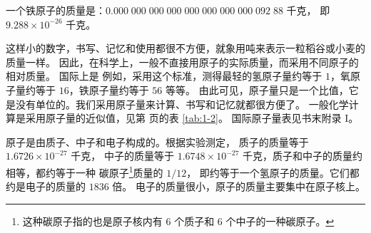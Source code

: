 一个铁原子的质量是：$0.000 \; 000 \; 000 \; 000 \; 000 \; 000 \; 000 \; 000 \; 092 \; 88$ 千克，
即 $9.288 \times 10^{-26}$ 千克。

这样小的数字，书写、记忆和使用都很不方便，就象用吨来表示一粒稻谷或小麦的质量一样。
因此，在科学上，一般不直接用原子的实际质量，而采用不同原子的相对质量。
国际上是
例如，采用这个标准，测得最轻的氢原子量约等于 $1$，氧原子量约等于 $16$，铁原子量约等于 $56$ 等等。
由此可见，原子量只是一个比值，它是没有单位的。我们采用原子量来计算、书写和记忆就都很方便了。
一般化学计算是采用原子量的近似值，见第 \pageref{tab:1-2} 页的表 \ref{tab:1-2}。
国际原子量表见书末附录 I。

原子是由质子、中子和电子构成的。根据实验测定，
质子的质量等于 $1.6726 \times 10^{-27}$ 千克，
中子的质量等于 $1.6748 \times 10^{-27}$ 千克，质子和中子的质量约相等，都约等于一种
碳原子\footnote{这种碳原子指的也是原子核内有 $6$ 个质子和 $6$ 个中子的一种碳原子。}质量的 $1/12$，
即约等于一个氢原子的质量。它们都约是电子的质量的 $1836$ 倍。
电子的质量很小，原子的质量主要集中在原子核上。


\begin{xiti}



\begin{xiaoxiaotis}




\end{xiaoxiaotis}




\end{xiti}


